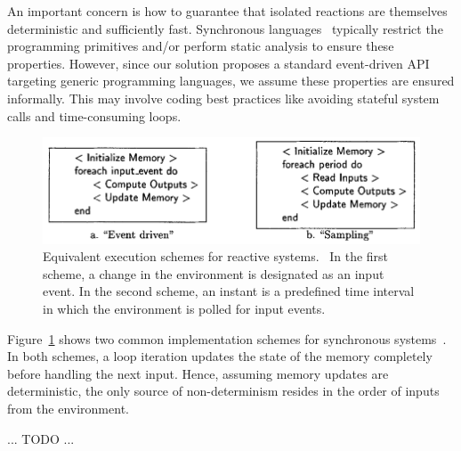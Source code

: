 \documentclass[sigplan,screen]{acmart}
\begin{document}
An important concern is how to guarantee that isolated reactions are themselves
deterministic and sufficiently fast.
Synchronous languages~\cite{langs} typically restrict the programming
primitives and/or perform static analysis to ensure these properties.
However, since our solution proposes a standard event-driven API targeting
generic programming languages, we assume these properties are ensured
informally.
This may involve coding best practices like avoiding stateful system calls and
time-consuming loops.

\begin{figure}[t]
  \centering
  \includegraphics[width=\linewidth]{schemes}
  \caption{
    \label{fig.schemes}
    Equivalent execution schemes for reactive systems.~\cite{schemes}
    In the first scheme, a change in the environment is designated as an input
    event. 
    In the second scheme, an instant is a predefined time interval in which
    the environment is polled for input events.
  }
\end{figure}

Figure~\ref{fig.schemes} shows two common implementation schemes for
synchronous systems~\cite{schemes}.
In both schemes, a loop iteration updates the state of the memory completely
before handling the next input.
Hence, assuming memory updates are deterministic, the only source of
non-determinism resides in the order of inputs from the environment.

... TODO ...
\end{document}
